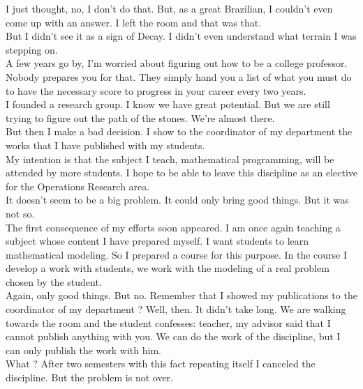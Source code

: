 \documentclass[11pt]{book}
\begin{document}
\noindent I just thought, no, I don't do that. But, as a great Brazilian, I couldn't even come up with an answer. I left the room and that was that. \\

\noindent But I didn't see it as a sign of Decay. I didn't even understand what terrain I was stepping on. \\

\noindent A few years go by, I'm worried about figuring out how to be a college professor. Nobody prepares you for that. They simply hand you a list of what you must do to have the necessary score to progress in your career every two years. \\

\noindent I founded a research group. I know we have great potential. But we are still trying to figure out the path of the stones. We're almost there. \\

\noindent But then I make a bad decision. I show to the coordinator of my department the works that I have published with my students. \\

\noindent My intention is that the subject I teach, mathematical programming, will be attended by more students. I hope to be able to leave this discipline as an elective for the Operations Research area. \\

\noindent It doesn't seem to be a big problem. It could only bring good things. But it was not so. \\

\noindent The first consequence of my efforts soon appeared. I am once again teaching a subject whose content I have prepared myself. I want students to learn mathematical modeling. So I prepared a course for this purpose. In the course I develop a work with students, we work with the modeling of a real problem chosen by the student. \\

\noindent Again, only good things. But no. Remember that I showed my publications to the coordinator of my department ? Well, then. It didn't take long. We are walking towards the room and the student confesses: teacher, my advisor said that I cannot publish anything with you. We can do the work of the discipline, but I can only publish the work with him. \\

\noindent  What ?  After two semesters with this fact repeating itself I canceled the discipline. But the problem is not over. \\
\end{document}
